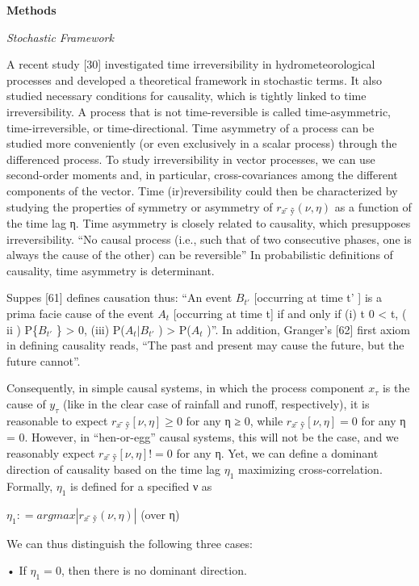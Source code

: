 \documentclass[
]{book}
\begin{document}
\textbf{Methods}

\emph{Stochastic Framework}

A recent study {[}30{]} investigated time irreversibility in hydrometeorological processes and
developed a theoretical framework in stochastic terms. It also studied necessary conditions for
causality, which is tightly linked to time irreversibility.
A process that is not time-reversible is called time-asymmetric, time-irreversible, or time-directional.
Time asymmetry of a process can be studied more conveniently (or even exclusively in a scalar
process) through the differenced process.
To study irreversibility in vector processes, we can use second-order moments and, in particular,
cross-covariances among the different components of the vector.
Time (ir)reversibility could then be characterized by studying the properties of symmetry
or asymmetry of \(r_{x̃ ỹ}( ν, η )\) as a function of the time lag η.
Time asymmetry is closely related to causality, which presupposes irreversibility.
``No causal process (i.e., such that of two consecutive phases, one is always the cause of the other) can be reversible''
In probabilistic definitions of causality, time asymmetry is determinant.

Suppes {[}61{]} defines causation thus: ``An event \(B_{t'}\) {[}occurring at time t' {]}
is a prima facie cause of the event \(A_t\) {[}occurring at time t{]}
if and only if (i) t 0 \textless{} t, ( ii ) P\{\(B_{t'}\) \} \textgreater{} 0, (iii) P(\(A_t | B_{t'}\) ) \textgreater{} P(\(A_t\) )''.
In addition, Granger's {[}62{]} first axiom in defining causality reads,
``The past and present may cause the future, but the future cannot''.

Consequently, in simple causal systems, in which the process component \(x_τ\)
is the cause of \(y_τ\) (like in the clear case of rainfall and runoff, respectively),
it is reasonable to expect \(r_{x̃ỹ}[ ν, η ] ≥ 0\) for any η ≥ 0,
while \(r_{x̃ỹ}[ ν, η ] = 0\) for any η = 0.
However, in ``hen-or-egg'' causal systems, this will not be the case,
and we reasonably expect \(r_{x̃ỹ}[ ν, η ] != 0\) for any η.
Yet, we can define a dominant direction of causality
based on the time lag \(η_1\) maximizing cross-correlation.
Formally, \(η_1\) is defined for a specified ν as

\(η_1 : = argmax |r_{x̃ỹ} ( ν, η )|\) (over η)

We can thus distinguish the following three cases:

• If \(η_1 = 0\), then there is no dominant direction.
\end{document}
